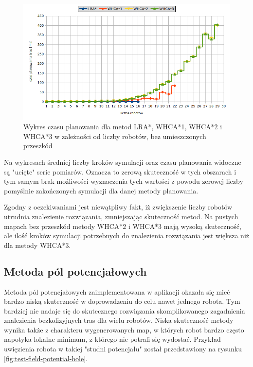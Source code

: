 \begin{figure}
	\centering
	\includegraphics[width=0.8\columnwidth]{img/plots/test-steps-empty-robots-calctime}
	\caption{Wykres czasu planowania dla metod LRA*, WHCA*1, WHCA*2 i WHCA*3 w zależności od liczby robotów, bez umieszczonych przeszkód}
	\label{fig:test-steps-empty-robots-calctime}
\end{figure}

Na wykresach średniej liczby kroków symulacji oraz czasu planowania widoczne są "ucięte" serie pomiarów. Oznacza to zerową skuteczność w tych obszarach i tym samym brak możliwości wyznaczenia tych wartości z powodu zerowej liczby pomyślnie zakończonych symulacji dla danej metody planowania.

Zgodny z oczekiwaniami jest niewątpliwy fakt, iż zwiększenie liczby robotów utrudnia znalezienie rozwiązania, zmniejszając skuteczność metod.
Na pustych mapach bez przeszkód metody WHCA*2 i WHCA*3 mają wysoką skuteczność, ale ilość kroków symulacji potrzebnych do znalezienia rozwiązania jest większa niż dla metody WHCA*3.

\subsection{Metoda pól potencjałowych}
Metoda pól potencjałowych zaimplementowana w aplikacji okazała się mieć bardzo niską skuteczność w doprowadzeniu do celu nawet jednego robota.
Tym bardziej nie nadaje się do skutecznego rozwiązania skomplikowanego zagadnienia znalezienia bezkolizyjnych tras dla wielu robotów.
Niska skuteczność metody wynika także z charakteru wygenerowanych map, w których robot bardzo często napotyka lokalne minimum, z którego nie potrafi się wydostać.
Przykład uwięzienia robota w takiej "studni potencjału" został przedstawiony na rysunku \ref{fig:test-field-potential-hole}.

